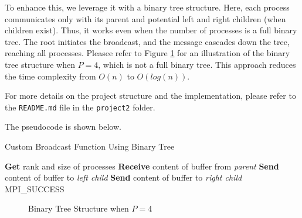 \documentclass[12pt,a4paper]{article}
\begin{document}
To enhance this, 
we leverage it with a binary tree structure. 
Here, each process communicates only with its parent and potential left and right children (when children exist). 
Thus, it works even when the number of processes is a full binary tree.
The root initiates the broadcast, and the message cascades down the tree, reaching all processes.
Pleasee refer to Figure \ref{fig:binary_tree} for an illustration of the binary tree structure when $P = 4$,
which is not a full binary tree.
This approach reduces the time complexity from $O(n)$ to $O(log(n))$.

For more details on the project structure and the implementation, 
please refer to the \texttt{README.md} file in the \texttt{project2} folder.

The pseudocode is shown below.
\begin{algorithm}
    \caption{Custom Broadcast Function Using Binary Tree}
    \begin{algorithmic}[1]
    \State \textbf{Get} rank and size of processes
            \State \textbf{Receive} content of buffer from \textit{parent} 
        \EndIf
            \State \textbf{Send} content of buffer to \textit{left child} 
        \EndIf
            \State \textbf{Send} content of buffer to \textit{right child} 
        \EndIf
        \State \Return MPI\_SUCCESS
    \EndProcedure
    \end{algorithmic}
\end{algorithm}

\begin{figure}
    \centering
    \caption{Binary Tree Structure when $P = 4$}
    \label{fig:binary_tree}
\end{figure}
  
\end{document}
